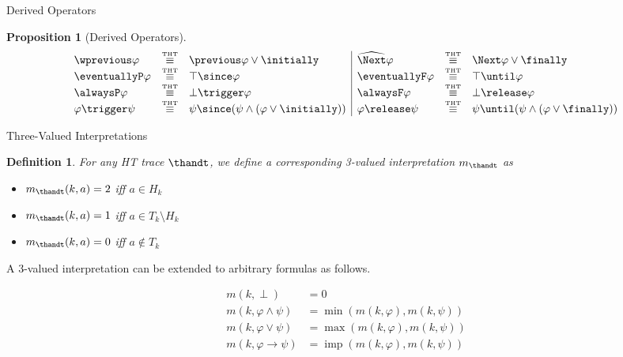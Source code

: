 \documentclass[aspectratio=169,xcolor=svgnames]{beamer}
\theoremstyle{theoremstyle_space}
\newtheorem{definition}{Definition}
\newtheorem{proposition}{Proposition}
\begin{document}
\begin{frame}[t]{Derived Operators}
  
\begin{proposition}[Derived Operators]\label{prop:derived-op}
\[
\begin{array}{lll|lll}
\wprevious \varphi & \equivtht & \previous \varphi \vee \initially &
\wnext \varphi & \equivtht & \Next \varphi \vee \finally\\
\eventuallyP \varphi & \equivtht & \top \since \varphi &
\eventuallyF \varphi & \equivtht & \top \until \varphi\\
\alwaysP \varphi & \equivtht & \bot \trigger \varphi &
\alwaysF \varphi & \equivtht & \bot \release \varphi\\
\varphi \trigger \psi &\equivtht & \psi \since (\psi \wedge (\varphi \vee \initially)) &
\varphi \release \psi &\equivtht &\psi \until (\psi \wedge (\varphi \vee \finally))
\end{array}
\]
\end{proposition}
\end{frame}

\begin{frame}[t]{Three-Valued Interpretations}

\begin{definition}
  For any HT trace $\thandt$, we define a corresponding 3-valued
  interpretation $m_{\thandt}$ as 
  \begin{itemize}
  \item $m_{\thandt}(k,a)=2$ iff $a \in H_k$
  \item $m_{\thandt}(k,a)=1$ iff $a \in T_k \setminus H_k$ 
  \item $m_{\thandt}(k,a)=0$ iff $a \not\in T_k$
\end{itemize}
\end{definition}

A 3-valued interpretation can be extended to arbitrary formulas as follows.

\begin{align*}
  m(k, \perp) &= 0 \\
  m(k, \varphi \wedge \psi) &= \min (m(k, \varphi), m(k, \psi)) \\
  m(k, \varphi \vee \psi) &= \max (m(k, \varphi), m(k, \psi)) \\
  m(k, \varphi \rightarrow \psi) &= \operatorname{imp}(m(k, \varphi), m(k, \psi)) \\
\end{align*}
\end{frame}
\end{document}
